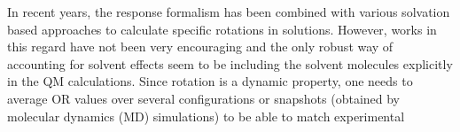 %
%
%
%
%
%
%
%
%
%
%
%
%
In recent years, the response formalism has been combined with various solvation based
approaches\cite{Neugebauer05,Neugebauer09,Mennucci02,Tomasi05,JensenGordon96}
to calculate specific rotations in solutions. 
%
%
However, works in this regard have not been very encouraging\cite{silva04,Stephens001,Kongsted05,Mennucci02} 
and the only robust way of accounting for solvent effects seem to be including the solvent molecules explicitly 
in the QM calculations. Since rotation is a dynamic property, one needs to average OR values over several 
configurations or snapshots (obtained by molecular dynamics (MD) simulations) to be able to match experimental 
